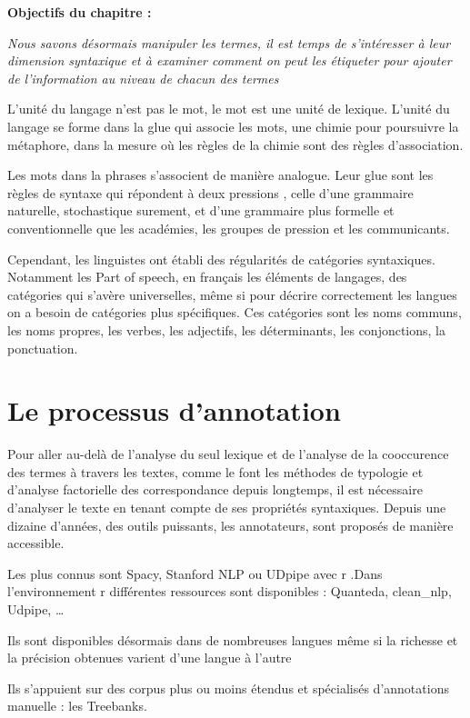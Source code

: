 \documentclass[
  letterpaper,
  DIV=11,
  numbers=noendperiod]{scrreprt}
\begin{document}
\textbf{Objectifs du chapitre :}

\emph{Nous savons désormais manipuler les termes, il est temps de
s'intéresser à leur dimension syntaxique et à examiner comment on peut
les étiqueter pour ajouter de l'information au niveau de chacun des
termes}

L'unité du langage n'est pas le mot, le mot est une unité de lexique.
L'unité du langage se forme dans la glue qui associe les mots, une
chimie pour poursuivre la métaphore, dans la mesure où les règles de la
chimie sont des règles d'association.

Les mots dans la phrases s'associent de manière analogue. Leur glue sont
les règles de syntaxe qui répondent à deux pressions , celle d'une
grammaire naturelle, stochastique surement, et d'une grammaire plus
formelle et conventionnelle que les académies, les groupes de pression
et les communicants.

Cependant, les linguistes ont établi des régularités de catégories
syntaxiques. Notamment les Part of speech, en français les éléments de
langages, des catégories qui s'avère universelles, même si pour décrire
correctement les langues on a besoin de catégories plus spécifiques. Ces
catégories sont les noms communs, les noms propres, les verbes, les
adjectifs, les déterminants, les conjonctions, la ponctuation.

\section{Le processus d'annotation}\label{le-processus-dannotation}

Pour aller au-delà de l'analyse du seul lexique et de l'analyse de la
cooccurence des termes à travers les textes, comme le font les méthodes
de typologie et d'analyse factorielle des correspondance depuis
longtemps, il est nécessaire d'analyser le texte en tenant compte de ses
propriétés syntaxiques. Depuis une dizaine d'années, des outils
puissants, les annotateurs, sont proposés de manière accessible.

Les plus connus sont Spacy, Stanford NLP ou UDpipe avec r .Dans
l'environnement r différentes ressources sont disponibles : Quanteda,
clean\_nlp, Udpipe, \ldots{}

Ils sont disponibles désormais dans de nombreuses langues même si la
richesse et la précision obtenues varient d'une langue à l'autre

Ils s'appuient sur des corpus plus ou moins étendus et spécialisés
d'annotations manuelle : les Treebanks.
\end{document}
